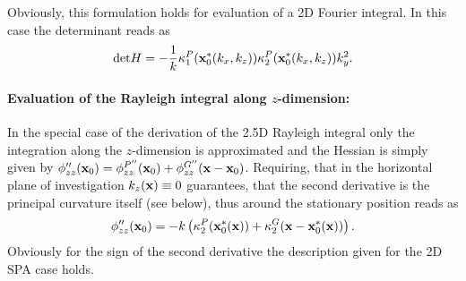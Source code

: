 Obviously, this formulation holds for evaluation of a 2D Fourier integral.
In this case the determinant reads as
\begin{equation}
\mathrm{det} H  = -\frac{1}{k} \kappa_1^P(\mathbf{x}_0^*(k_x,k_z)) \kappa_2^P(\mathbf{x}_0^*(k_x,k_z	)) k_y^2.
\end{equation}


\paragraph{Evaluation of the Rayleigh integral along $z$-dimension:}
In the special case of the derivation of the 2.5D Rayleigh integral only the integration along the $z$-dimension is approximated and the Hessian is simply given by $\phi''_{zz}(\mathbf{x}_0) =\phi^{P''}_{zz}(\mathbf{x}_0) + \phi^{G''}_{zz}(\mathbf{x}-\mathbf{x}_0)$.
Requiring, that in the horizontal plane of investigation $k_z(\mathbf{x}) \equiv 0$ guarantees, that the second derivative is the principal curvature itself (see below), thus around the stationary position reads as
\begin{equation}
\phi''_{zz}(\mathbf{x}_0) = -k \left( \kappa_2^P(\mathbf{x}_0^*(\mathbf{x})) + \kappa_2^G(\mathbf{x}-\mathbf{x}_0^*(\mathbf{x})) \right).
\end{equation}
Obviously for the sign of the second derivative the description given for the 2D SPA case holds.

